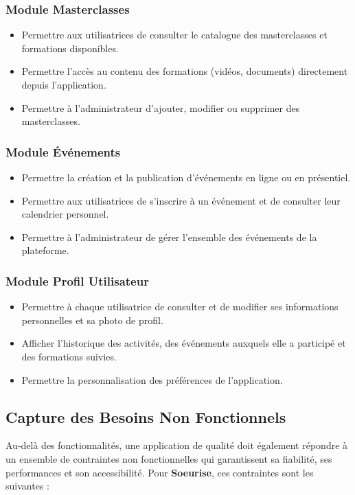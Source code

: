 \documentclass[12pt,a4paper]{report}
\begin{document}
	\subsubsection*{Module Masterclasses}
	\begin{itemize}
		\item Permettre aux utilisatrices de consulter le catalogue des 
		masterclasses et formations disponibles.
		\item Permettre l'accès au contenu des formations (vidéos, documents) 
		directement depuis l'application.
		\item Permettre à l'administrateur d'ajouter, modifier ou supprimer 
		des masterclasses.
	\end{itemize}
	
	\subsubsection*{Module Événements}
	\begin{itemize}
		\item Permettre la création et la publication d'événements en ligne 
		ou en présentiel.
		\item Permettre aux utilisatrices de s'inscrire à un événement et 
		de consulter leur calendrier personnel.
		\item Permettre à l'administrateur de gérer l'ensemble des événements 
		de la plateforme.
	\end{itemize}
	
	\subsubsection*{Module Profil Utilisateur}
	\begin{itemize}
		\item Permettre à chaque utilisatrice de consulter et de modifier 
		ses informations personnelles et sa photo de profil.
		\item Afficher l'historique des activités, des événements auxquels 
		elle a participé et des formations suivies.
		\item Permettre la personnalisation des préférences de l'application.
	\end{itemize}
	
	\subsection{Capture des Besoins Non Fonctionnels}
	
	Au-delà des fonctionnalités, une application de qualité doit également répondre 
	à un ensemble de contraintes non fonctionnelles qui garantissent sa fiabilité, 
	ses performances et son accessibilité. Pour \textbf{Soeurise}, ces contraintes 
	sont les suivantes :
	
\end{document}
